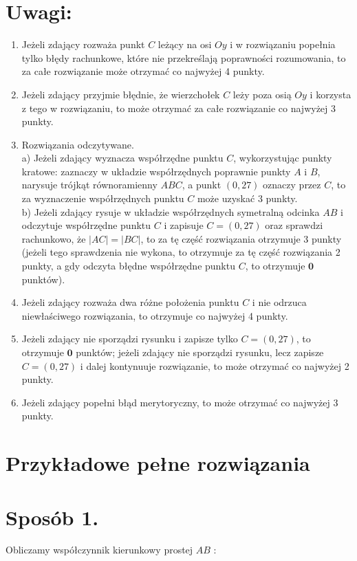 \documentclass[10pt]{article}
\begin{document}
\section*{Uwagi:}
\begin{enumerate}
  \item Jeżeli zdający rozważa punkt $C$ leżący na osi $O y$ i w rozwiązaniu popełnia tylko błędy rachunkowe, które nie przekreślają poprawności rozumowania, to za całe rozwiązanie może otrzymać co najwyżej 4 punkty.
  \item Jeżeli zdający przyjmie błędnie, że wierzchołek $C$ leży poza osią $O y$ i korzysta z tego w rozwiązaniu, to może otrzymać za całe rozwiązanie co najwyżej 3 punkty.
  \item Rozwiązania odczytywane.\\
a) Jeżeli zdający wyznacza współrzędne punktu $C$, wykorzystując punkty kratowe: zaznaczy w układzie współrzędnych poprawnie punkty $A$ i $B$, narysuje trójkąt równoramienny $A B C$, a punkt $(0,27)$ oznaczy przez $C$, to za wyznaczenie współrzędnych punktu $C$ może uzyskać 3 punkty.\\
b) Jeżeli zdający rysuje w układzie współrzędnych symetralną odcinka $A B$ i odczytuje współrzędne punktu $C$ i zapisuje $C=(0,27)$ oraz sprawdzi rachunkowo, że $|A C|=|B C|$, to za tę część rozwiązania otrzymuje 3 punkty (jeżeli tego sprawdzenia nie wykona, to otrzymuje za tę część rozwiązania 2 punkty, a gdy odczyta błędne współrzędne punktu $C$, to otrzymuje $\mathbf{0}$ punktów).
  \item Jeżeli zdający rozważa dwa różne położenia punktu $C$ i nie odrzuca niewłaściwego rozwiązania, to otrzymuje co najwyżej 4 punkty.
  \item Jeżeli zdający nie sporządzi rysunku i zapisze tylko $C=(0,27)$, to otrzymuje $\mathbf{0}$ punktów; jeżeli zdający nie sporządzi rysunku, lecz zapisze $C=(0,27)$ i dalej kontynuuje rozwiązanie, to może otrzymać co najwyżej 2 punkty.
  \item Jeżeli zdający popełni błąd merytoryczny, to może otrzymać co najwyżej 3 punkty.
\end{enumerate}

\section*{Przykładowe pełne rozwiązania}
\section*{Sposób 1.}
Obliczamy współczynnik kierunkowy prostej $A B$ :
\end{document}
